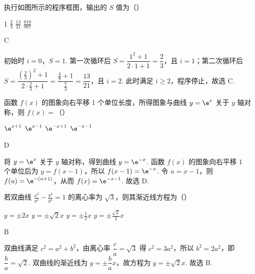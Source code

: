 \begin{problem}
执行如图所示的程序框图，输出的 \(S\) 值为（\quad）


\choices
    {1}
    {\(\frac{2}{3}\)}
    {\(\frac{13}{21}\)}
    {\(\frac{610}{987}\)}
\end{problem}

\begin{answer}
C
\end{answer}

\begin{solution}

初始时 \(i=0\)，\(S=1\). 第一次循环后
\(S=\dfrac{1^2+1}{2\cdot1+1}=\dfrac23\)，且 \(i=1\)；第二次循环后
\(S=\dfrac{(\frac23)^2+1}{2\cdot\frac23+1}=\dfrac{\frac49+1}{\frac73}=\dfrac{13}{21}\)，且 \(i=2\). 此时满足 \(i\geqslant2\)，程序停止，故选 C.
\end{solution}

\begin{problem}
函数 \( f(x) \) 的图象向右平移 1 个单位长度，所得图象与曲线 \( y = \e^{x} \) 关于 \( y \) 轴对称，则 \( f(x) = \)（\quad）

\choices
    {\(\e^{x + 1}\)}
    {\(\e^{x - 1}\)}
    {\(\e^{-x + 1}\)}
    {\(\e^{-x - 1}\)}
\end{problem}

\begin{answer}
D
\end{answer}

\begin{solution}

将 \(y=\e^x\) 关于 \(y\) 轴对称，得到曲线 \(y=\e^{-x}\). 函数 \(f(x)\) 的图象向右平移 \(1\) 个单位后为 \(y=f(x-1)\)，所以 \(f(x-1)=\e^{-x}\). 令 \(u=x-1\)，则 \(f(u)=\e^{-(u+1)}\)，从而 \(f(x)=\e^{-x-1}\). 故选 D.
\end{solution}

\begin{problem}
若双曲线 \(\frac{x^2}{a^2} - \frac{y^2}{b^2} = 1\) 的离心率为 \(\sqrt{3}\)，则其渐近线方程为（\quad）

\choices
    {\(y = \pm 2x\)}
    {\(y = \pm \sqrt{2} x\)}
    {\(y = \pm \frac{1}{2} x\)}
    {\(y = \pm \frac{\sqrt{2}}{2} x\)}
\end{problem}

\begin{answer}
B
\end{answer}

\begin{solution}

双曲线满足 \(c^2=a^2+b^2\)，由离心率 \(\dfrac ca=\sqrt3\) 得 \(c^2=3a^2\)，所以 \(b^2=2a^2\)，即 \(\dfrac ba=\sqrt2\). 双曲线的渐近线为 \(y=\pm\dfrac ba x\)，故方程为 \(y=\pm\sqrt2 x\). 故选 B.
\end{solution}

